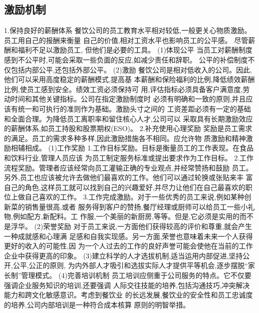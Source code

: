 \subsection{激励机制}
1.保持良好的薪酬体系
餐饮公司的员工教育水平相对较低,一般更关心物质激励。 员工用自己的报酬来衡量
自己的价值,相对工资水平也影响员工的公平感。 尽管薪酬和福利不足以激励员工,
但他们是必要的工具。
(1)体现公平
当员工对薪酬制度感到不公平时,可能会采取一些负面的反应,如减少责任和辞职。
公平的补偿制度不仅包括内部公平,还包括外部公平。
(2)激励
餐饮公司是相对低收入的公司。因此,他们可以采用高度稳定的薪酬模式,提高基
本薪酬和保险福利的比例,降低绩效薪酬比例,使员工感到安全。绩效工资必须保持可
用,评估指标必须具备客户满意度,劳动时间和其他关键指标。公司在指定激励制度时
必须有明确和一致的原则,并且应该有统一和可执行的准则作为基础。激励头寸之间的
工资差距必须有一定的基础和全面合理。为降低员工离职率和留住核心人才,公司可以
采取具有长期激励效应的薪酬体系,如员工持股和股票期权(ESO)。
2.补充使用心理奖励
奖励是员工需求的满足。员工的需求多种多样,因此激励措施各不相同。应允许物
质激励和精神激励相辅相成。
(1)工作奖励
1.工作目标奖励。目标是衡量员工的工作表现。在食品和饮料行业,管理人员应该
为员工制定服务标准或提出要求作为工作目标。
2.工作流程奖励。管理者应该经常向员工灌输正确的专业观点,并经常赞扬和鼓励
员工。另外,员工也应该被允许去做他们最喜欢的工作。他们可以通过轮换或张贴来丰
富自己的角色,这样员工就可以找到自己的兴趣爱好,并尽力让他们在自己最喜欢的职
位上做自己喜欢的工作。
3.工作完成激励。对于一些优秀的员工来说,例如某种创新菜的销售量很高,或者
服务得到客户的赞扬,餐厅经理或厨师可以给员工一些小礼物,例如配方,新配料。工
作服,一个美丽的新厨房,等等。但是,它必须是实用的而不是浮华。
(2)荣誉奖励
对于员工来说,一方面他们获得较高的评价和尊重,就会产生一种成就感和心理满
足感和自我实现感。另一方面,荣誉也意味着未来一个人获得更好的收入的可能性,因
为一个人过去的工作的良好声誉可能会使他在当前的工作企业中获得更高的印象。
(3)建立科学的人才选拔机制,适当运用内部促进,坚持公开,公平,公正的原则,
为内外部人才吸引和选拔实际人才提供平等机会,逐步摆脱“家长制”管理模式。
(4)完善培训机制
员工培训应侧重于公司服务的特点。它不仅要强调企业服务知识的培训,还要强调
人际交往技能的培养,包括沟通技巧,冲突解决能力和跨文化敏感意识。考虑到餐饮业
的长远发展,餐饮业的安全性和员工忠诚度的培养,公司内部培训是一种符合成本核算
原则的明智举措。
